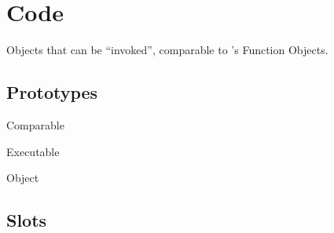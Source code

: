 \section{Code}

Objects that can be ``invoked'', comparable to \Cxx's Function Objects.

\subsection{Prototypes}

\begin{refObjects}
\item[Comparable]
\item[Executable]
\item[Object]
\end{refObjects}

\subsection{Slots}

